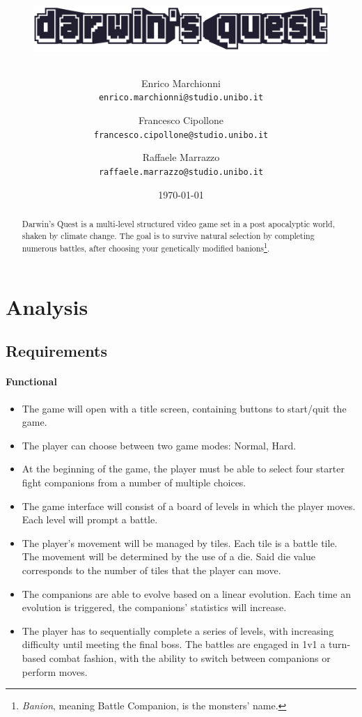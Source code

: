 \documentclass[12pt, a4paper]{report}
\title{
    \begin{figure}[ht]
    \centering{}
    \includegraphics[width=\textwidth]{logo} %
    \end{figure}
}
\author{
    Enrico Marchionni\\
    \texttt{enrico.marchionni@studio.unibo.it}
    \and
    Francesco Cipollone\\
    \texttt{francesco.cipollone@studio.unibo.it}
    \and
    Raffaele Marrazzo\\
    \texttt{raffaele.marrazzo@studio.unibo.it}
}
\date{\today}
\theoremstyle{definition}
\begin{document}
\maketitle

\begin{abstract}

    Darwin's Quest \cite{ontheoriginofspiecies} is a multi-level structured video game set in a post apocalyptic world,
    shaken by climate change. The goal is to survive natural selection by completing numerous battles,
    after choosing your genetically modified banions\footnote{\emph{Banion}, meaning Battle Companion, is the monsters' name.}.

\end{abstract}

\tableofcontents

\chapter{Analysis}

\section{Requirements}

\subsubsection{Functional}

\begin{itemize}
    \item The game will open with a title screen, containing buttons to start/quit the game.
    \item The player can choose between two game modes: Normal, Hard.
    \item At the beginning of the game, the player must be able to select four starter fight companions from a number of multiple choices.
    \item The game interface will consist of a board of levels in which the player moves. Each level will prompt a battle.
    \item The player's movement will be managed by tiles. Each tile is a battle tile.
        The movement will be determined by the use of a die. Said die value corresponds to the number of tiles that the player can move.
    \item The companions are able to evolve based on a linear evolution. Each time an evolution is triggered, the companions' statistics will increase.
    \item The player has to sequentially complete a series of levels, with increasing difficulty until meeting the final boss.
        The battles are engaged in 1v1 a turn-based combat fashion, with the ability to switch between companions or perform moves.
\end{itemize}
\end{document}
